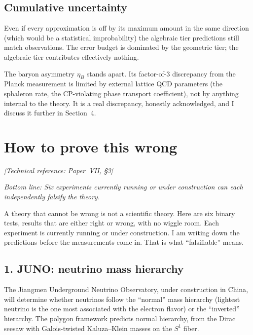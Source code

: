 \subsection*{Cumulative uncertainty}

Even if every approximation is off by its maximum amount in the same
direction (which would be a statistical improbability) the algebraic
tier predictions still match observations. The error budget is dominated
by the geometric tier; the algebraic tier contributes effectively
nothing.

The baryon asymmetry $\eta_B$ stands apart. Its factor-of-$3$
discrepancy from the Planck measurement is limited by external lattice
QCD parameters (the sphaleron rate, the CP-violating phase transport
coefficient), not by anything internal to the theory. It is a real
discrepancy, honestly acknowledged, and I discuss it further in
Section~4.


\section{How to prove this wrong}
\noindent\textit{[Technical reference: Paper~VII, \S3]}

\medskip

\noindent\textit{Bottom line: Six experiments currently running or under
construction can each independently falsify the theory.}

\medskip

A theory that cannot be wrong is not a scientific theory. Here are six
binary tests, results that are either right or wrong, with no wiggle
room. Each experiment is currently running or under construction. I am
writing down the predictions before the measurements come in. That is
what ``falsifiable'' means.

\subsection*{1. JUNO: neutrino mass hierarchy}

The Jiangmen Underground Neutrino Observatory, under construction in
China, will determine whether neutrinos follow the ``normal'' mass
hierarchy (lightest neutrino is the one most associated with the electron
flavor) or the ``inverted'' hierarchy. The polygon framework predicts
normal hierarchy, from the Dirac seesaw with Galois-twisted
Kaluza--Klein masses on the $S^1$ fiber.

